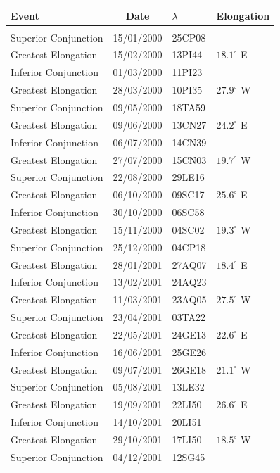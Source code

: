 \clearpage
\begin{table}[!h]\centering
\vspace{0.25cm}
{\small\begin{tabular}{lcll}
Event & Date & $\lambda$& Elongation \\\hline
&&&\\[-1.75ex]
Superior Conjunction & 15/01/2000 & 25CP08&\\
Greatest Elongation & 15/02/2000 & 13PI44 & $18.1^\circ$ E\\
Inferior Conjunction & 01/03/2000 & 11PI23&\\
Greatest Elongation & 28/03/2000 & 10PI35 & $27.9^\circ$ W\\
Superior Conjunction & 09/05/2000 & 18TA59&\\
Greatest Elongation & 09/06/2000 & 13CN27 & $24.2^\circ$ E\\
Inferior Conjunction & 06/07/2000 & 14CN39&\\
Greatest Elongation & 27/07/2000 & 15CN03 & $19.7^\circ$ W\\
Superior Conjunction & 22/08/2000 & 29LE16&\\
Greatest Elongation & 06/10/2000 & 09SC17 & $25.6^\circ$ E\\
Inferior Conjunction & 30/10/2000 & 06SC58&\\
Greatest Elongation & 15/11/2000 & 04SC02 & $19.3^\circ$ W\\
Superior Conjunction & 25/12/2000 & 04CP18&\\
Greatest Elongation & 28/01/2001 & 27AQ07 & $18.4^\circ$ E\\
Inferior Conjunction & 13/02/2001 & 24AQ23&\\
Greatest Elongation & 11/03/2001 & 23AQ05 & $27.5^\circ$ W\\
Superior Conjunction & 23/04/2001 & 03TA22&\\
Greatest Elongation & 22/05/2001 & 24GE13 & $22.6^\circ$ E\\
Inferior Conjunction & 16/06/2001 & 25GE26&\\
Greatest Elongation & 09/07/2001 & 26GE18 & $21.1^\circ$ W\\
Superior Conjunction & 05/08/2001 & 13LE32&\\
Greatest Elongation & 19/09/2001 & 22LI50 & $26.6^\circ$ E\\
Inferior Conjunction & 14/10/2001 & 20LI51&\\
Greatest Elongation & 29/10/2001 & 17LI50 & $18.5^\circ$ W\\
Superior Conjunction & 04/12/2001 & 12SG45&\\

\end{tabular}}
\end{table}
